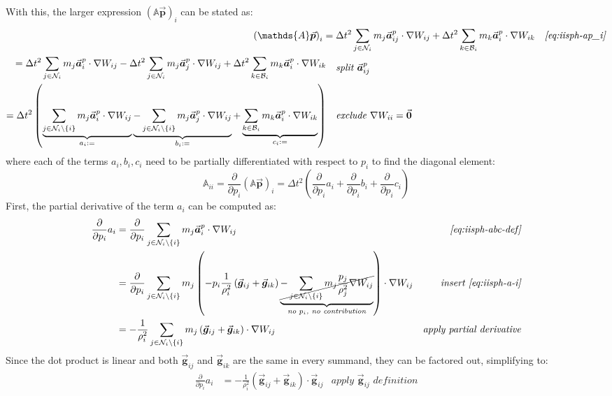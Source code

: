 \documentclass[oneside, a4paper]{book}
\newcommand\pdpi[0]{\frac{\partial}{\partial p_i}}
\newcommand\vek[1]{\vec{\bm{#1}}}
\newcommand\br[1]{\left(#1\right)}
\begin{document}
    With this, the larger expression $\br{\mathds{A}\vek{p}}_i$ can be stated as:
    \begin{align}
      \br{\mathds{A}\vek{p}}_{i}
      ={}&\Delta t^2 \sum_{j\in\mathcal{N}_i} m_j \vek{a}^p_{ij} \cdot \nabla W_{ij}
      +\Delta t^2 \sum_{k\in\mathcal{B}_i} m_k \vek{a}^p_{i} \cdot \nabla W_{ik} 
      &\textit{\autoref{eq:iisph-ap_i}}\\
      \begin{split}
        ={}&\Delta t^2 \sum_{j\in\mathcal{N}_i} m_j \vek{a}^p_{i} \cdot \nabla W_{ij}
        -\Delta t^2 \sum_{j\in\mathcal{N}_i} m_j \vek{a}^p_{j} \cdot \nabla W_{ij} +\Delta t^2 \sum_{k\in\mathcal{B}_i} m_k \vek{a}^p_{i} \cdot \nabla W_{ik}
      \end{split}
      &\textit{split $\vek{a}^p_{ij}$}\\
      \begin{split}
        ={}&\Delta t^2 
        \br{
          \underbrace{\sum_{j\in\mathcal{N}_i\setminus \{i\}} m_j \vek{a}^p_{i} \cdot \nabla W_{ij}}_{a_i:=}
          \underbrace{-\sum_{j\in\mathcal{N}_i\setminus \{i\}} m_j \vek{a}^p_{j} \cdot \nabla W_{ij} }_{b_i:=}
          +\underbrace{\sum_{k\in\mathcal{B}_i} m_k \vek{a}^p_{i} \cdot \nabla W_{ik}}_{c_i:=}
        }
      \end{split}
      &\textit{exclude $\nabla W_{ii}=\vek{0}$}\label{eq:iisph-abc-def}
    \end{align}
    where each of the terms $a_i,b_i,c_i$ need to be partially differentiated with respect to $p_i$ to find the diagonal element:
    \begin{equation}
      \mathds{A}_{ii} = \pdpi \br{\mathds{A}\vek{p}}_{i} = \Delta t^2\br{\pdpi a_i + \pdpi b_i + \pdpi c_i}\label{eq:iisph-ai-bi-ci}
    \end{equation}
    First, the partial derivative of the term $a_i$ can be computed as:
    \begin{align*}
      \pdpi a_i &=
      \pdpi \sum_{j\in\mathcal{N}_i\setminus \{i\}} m_j \vek{a}^p_{i} \cdot \nabla W_{ij} &\textit{\autoref{eq:iisph-abc-def}}\\
      &= \pdpi \sum_{j\in\mathcal{N}_i\setminus \{i\}} m_j \br{
        -p_i \frac{1}{\rho_i^2}\br{
        \vek{g}_{ij}
        +\vek{g}_{ik}
      }
      \underbrace{
        \cancel{- \sum_{j\in\mathcal{N}_i\setminus \{i\}} 
        m_j\frac{p_j}{\rho_j^2} \nabla W_{ij} }
      }_{\textit{no $p_i$, no contribution}}
      } \cdot \nabla W_{ij} &\textit{insert \autoref{eq:iisph-a-i}}\\
      &= -\frac{1}{\rho_i^2} \sum_{j\in\mathcal{N}_i\setminus \{i\}} m_j \br{\vek{g}_{ij} +\vek{g}_{ik}
      } \cdot \nabla W_{ij} &\textit{apply partial derivative}
    \end{align*}
    Since the dot product is linear and both $\vek{g}_{ij}$ and $\vek{g}_{ik}$ are the same in every summand, they can be factored out, simplifying to:
    \begin{align}
      \pdpi a_i &= -\frac{1}{\rho_i^2} \br{\vek{g}_{ij} +\vek{g}_{ik}} \cdot \vek{g}_{ij} &\textit{apply $\vek{g}_{ij}$ definition}\label{eq:iisph-dai-dpi}
    \end{align}
\end{document}
